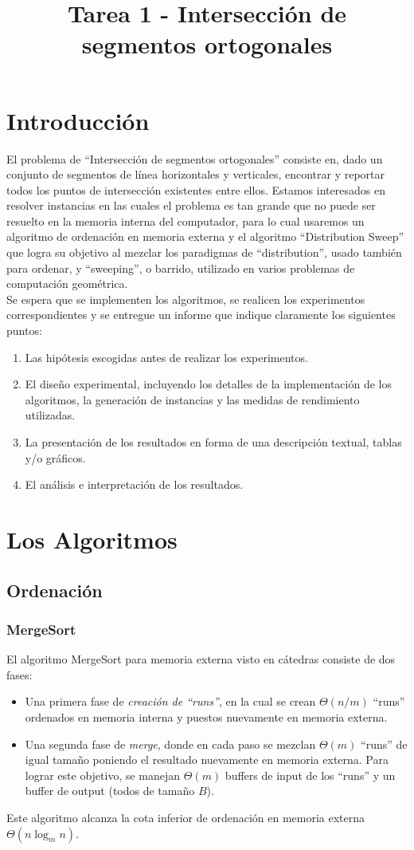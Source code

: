 \documentclass[dcc,uchile]{fcfmcourse}
\title{Tarea 1 - Intersección de segmentos ortogonales}
\begin{document}
\maketitle
\vspace{-1ex}
\section{Introducción}
El problema de ``Intersección de segmentos ortogonales'' consiste en,  dado un conjunto de segmentos de línea horizontales y verticales, encontrar y reportar todos los puntos de intersección existentes entre ellos. Estamos interesados en resolver instancias en las cuales el problema es tan grande que no puede ser resuelto en la memoria interna del computador, para lo cual usaremos un algoritmo de ordenación en memoria externa y el algoritmo ``Distribution Sweep'' que logra su objetivo al mezclar los paradigmas de ``distribution'', usado también para ordenar, y ``sweeping'', o barrido, utilizado en varios problemas de computación geométrica.\\


Se espera que se implementen los algoritmos, se realicen los experimentos correspondientes y se entregue un informe que indique claramente los siguientes puntos:
\begin{enumerate}[1.]
    \item Las hipótesis escogidas antes de realizar los experimentos.
    \item El diseño experimental, incluyendo los detalles de la implementación de los algoritmos, la generación de instancias y las medidas de rendimiento utilizadas.
    \item La presentación de los resultados en forma de una descripción textual, tablas y/o gráficos.
    \item El análisis e interpretación de los resultados.
\end{enumerate}
\section{Los Algoritmos}
\subsection{Ordenación}
\subsubsection{MergeSort}
El algoritmo MergeSort para memoria externa visto en cátedras consiste de dos fases:
\begin{itemize}
    \item Una primera fase de \textit{creación de ``runs''}, en la cual se crean $\Theta(n/m)$ ``runs'' ordenados en memoria interna y puestos nuevamente en memoria externa.
    \item Una segunda fase de \textit{merge}, donde en cada paso se mezclan $\Theta(m)$ ``runs'' de igual tamaño poniendo el resultado nuevamente en memoria externa. Para lograr este objetivo, se manejan $\Theta(m)$ buffers de input de los ``runs'' y un buffer de output (todos de tamaño $B$).
\end{itemize}
Este algoritmo alcanza la cota inferior de ordenación en memoria externa $\Theta(n\log_{m}n)$.
\end{document}
